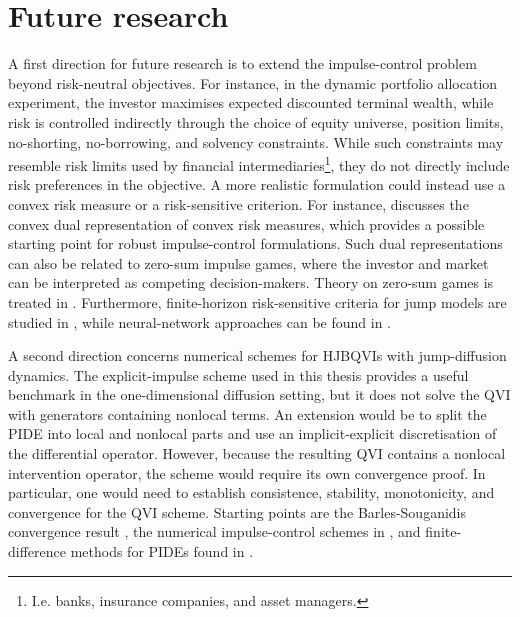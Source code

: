 \section*{Future research}
A first direction for future research is to extend the impulse-control problem beyond risk-neutral objectives. For instance, in the dynamic portfolio allocation experiment, the investor maximises expected discounted terminal wealth, while risk is controlled indirectly through the choice of equity universe, position limits, no-shorting, no-borrowing, and solvency constraints. While such constraints may resemble risk limits used by financial intermediaries\footnote{I.e. banks, insurance companies, and asset managers.}, they do not directly include risk preferences in the objective. A more realistic formulation could instead use a convex risk measure or a risk-sensitive criterion. For instance, \cite[Chapter 4.5.2]{oksendal2007applied} discusses the convex dual representation of convex risk measures, which provides a possible starting point for robust impulse-control formulations. Such dual representations can also be related to zero-sum impulse games, where the investor and market can be interpreted as competing decision-makers. Theory on zero-sum games is treated in \cite{azimzadeh2019zero, cosso2013stochastic}. Furthermore, finite-horizon risk-sensitive criteria for jump models are studied in \cite{davis2009jump, davis2011jump, davis2013jump, das2018risk}, while neural-network approaches can be found in \cite{bielecki2022risk, buehler2019deep, buehler2022deep, enders2024risk, fei2021exponential, noorani2025risk}.

A second direction concerns numerical schemes for HJBQVIs with jump-diffusion dynamics. The explicit-impulse scheme used in this thesis provides a useful benchmark in the one-dimensional diffusion setting, but it does not solve the QVI with generators containing nonlocal terms. An extension would be to split the PIDE into local and nonlocal parts and use an implicit-explicit discretisation of the differential operator. However, because the resulting QVI contains a nonlocal intervention operator, the scheme would require its own convergence proof. In particular, one would need to establish consistence, stability, monotonicity, and convergence for the QVI scheme. Starting points are the Barles-Souganidis convergence result \cite{barlessouganidis1991convergence}, the numerical impulse-control schemes in \cite{azimzadeh2016weakly, azimzadeh2018impulsecontrolfinancenumerical}, and finite-difference methods for PIDEs found in \cite{biswas2010difference}.

